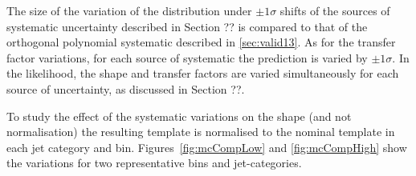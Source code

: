 The size of the variation of the \mht distribution under $\pm1\sigma$ shifts of the
sources of systematic uncertainty described in Section ?? is compared 
to that of the orthogonal polynomial systematic described in \ref{sec:valid13}.
As for the transfer factor variations, for each source of systematic the prediction 
is varied by $\pm1\sigma$. In the likelihood, the \mht shape and transfer factors
are varied simultaneously for each source of uncertainty, as discussed in Section ??.

To study the effect of the systematic variations on the \mht shape (and not normalisation) 
the resulting template is normalised to the nominal template in each jet category and \scalht bin. 
Figures~\ref{fig:mcCompLow} and \ref{fig:mcCompHigh} show the variations for two representative \scalht 
bins and jet-categories. 

